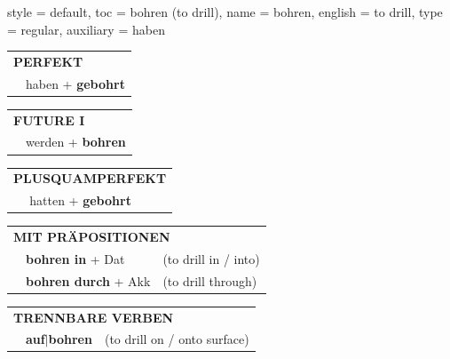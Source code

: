 \begin{verbentry}{
  style = {default},
  toc = {bohren (to drill)},
  name = {bohren},
  english = {to drill},
  type = {regular},
  auxiliary = {haben}
}
\vspace{10pt}

\begin{tabular}{rl}
\multicolumn{2}{l}{\textbf{PERFEKT}}\\
& haben + \textbf{gebohrt}\\
\end{tabular}
\hfill
\begin{tabular}{rl}
\multicolumn{2}{l}{\textbf{FUTURE I}}\\
& werden + \textbf{bohren}\\
\end{tabular}
\hfill
\begin{tabular}{rl}
\multicolumn{2}{l}{\textbf{PLUSQUAMPERFEKT}}\\
& hatten + \textbf{gebohrt}\\
\end{tabular}

\vspace{10pt}

\begin{tabular}{lll}
\multicolumn{3}{l}{\textbf{MIT PRÄPOSITIONEN}}\\
& \textbf{bohren in} + Dat & (to drill in / into)\\
& \textbf{bohren durch} + Akk & (to drill through)\\
\end{tabular}
\hfill
\begin{tabular}{lll}
\multicolumn{3}{l}{\textbf{TRENNBARE VERBEN}}\\
& \textbf{auf$|$bohren} & (to drill on / onto surface)\\
\end{tabular}
\vspace{-5pt}
\end{verbentry}

